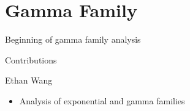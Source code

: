 \documentclass[12pt, letterpaper]{article}
\begin{document}
\newpage
\noindent
\section*{Gamma Family}
\normalsize
Beginning of gamma family analysis

\newpage
\begin{center}
    \Large
    Contributions
\end{center}

\normalsize
Ethan Wang
\begin{itemize}[leftmargin=50pt]
  \item Analysis of exponential and gamma families
\end{itemize}
\end{document}
